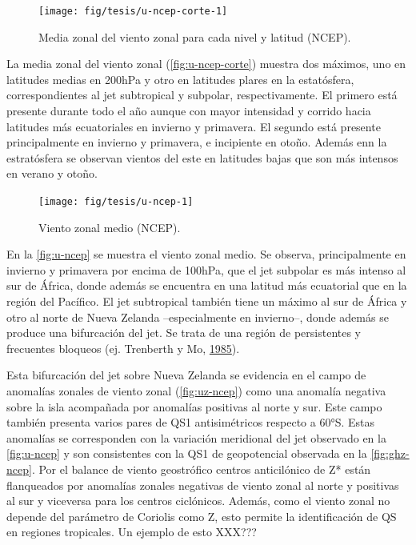 \documentclass[spanish,a4paper,12pt,oneside]{book}
\begin{document}
\begin{figure}
\texttt{[image: fig/tesis/u-ncep-corte-1]} \caption{Media zonal del viento zonal para cada nivel y latitud (NCEP).}\label{fig:u-ncep-corte}
\end{figure}

La media zonal del viento zonal (\autoref{fig:u-ncep-corte}) muestra dos
máximos, uno en latitudes medias en 200hPa y otro en latitudes plares en
la estatósfera, correspondientes al jet subtropical y subpolar,
respectivamente. El primero está presente durante todo el año aunque con
mayor intensidad y corrido hacia latitudes más ecuatoriales en invierno
y primavera. El segundo está presente principalmente en invierno y
primavera, e incipiente en otoño. Además enn la estratósfera se observan
vientos del este en latitudes bajas que son más intensos en verano y
otoño.

\begin{landscape}\begin{figure}

{\centering \texttt{[image: fig/tesis/u-ncep-1]} 

}

\caption{Viento zonal medio (NCEP).}\label{fig:u-ncep}
\end{figure}
\end{landscape}

En la \autoref{fig:u-ncep} se muestra el viento zonal medio. Se observa,
principalmente en invierno y primavera por encima de 100hPa, que el jet
subpolar es más intenso al sur de África, donde además se encuentra en
una latitud más ecuatorial que en la región del Pacífico. El jet
subtropical también tiene un máximo al sur de África y otro al norte de
Nueva Zelanda --especialmente en invierno--, donde además se produce una
bifurcación del jet. Se trata de una región de persistentes y frecuentes
bloqueos (ej. Trenberth y Mo,
\protect\hyperlink{ref-Trenberth1985}{1985}).

Esta bifurcación del jet sobre Nueva Zelanda se evidencia en el campo de
anomalías zonales de viento zonal (\autoref{fig:uz-ncep}) como una
anomalía negativa sobre la isla acompañada por anomalías positivas al
norte y sur. Este campo también presenta varios pares de QS1
antisimétricos respecto a 60°S. Estas anomalías se corresponden con la
variación meridional del jet observado en la \autoref{fig:u-ncep} y son
consistentes con la QS1 de geopotencial observada en la
\autoref{fig:ghz-ncep}. Por el balance de viento geostrófico centros
anticilónico de Z* están flanqueados por anomalías zonales negativas de
viento zonal al norte y positivas al sur y viceversa para los centros
ciclónicos. Además, como el viento zonal no depende del parámetro de
Coriolis como Z, esto permite la identificación de QS en regiones
tropicales. Un ejemplo de esto XXX???
\end{document}

